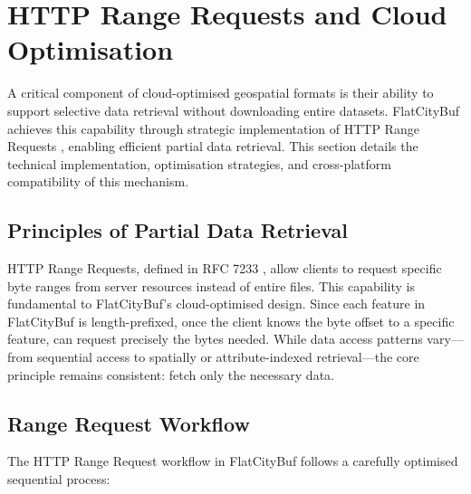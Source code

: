 
\section{HTTP Range Requests and Cloud Optimisation}
\label{methodology:http_range_requests}

A critical component of cloud-optimised geospatial formats is their ability to support selective data retrieval without downloading entire datasets. FlatCityBuf achieves this capability through strategic implementation of HTTP Range Requests \citep{http_range_requests}, enabling efficient partial data retrieval. This section details the technical implementation, optimisation strategies, and cross-platform compatibility of this mechanism.

\subsection{Principles of Partial Data Retrieval}
\label{methodology:http_range_requests:partial_retrieval_principles}

HTTP Range Requests, defined in RFC 7233 \citep{rfc_7233}, allow clients to request specific byte ranges from server resources instead of entire files. This capability is fundamental to FlatCityBuf's cloud-optimised design. Since each feature in FlatCityBuf is length-prefixed, once the client knows the byte offset to a specific feature, can request precisely the bytes needed. While data access patterns vary—from sequential access to spatially or attribute-indexed retrieval—the core principle remains consistent: fetch only the necessary data.

\subsection{Range Request Workflow}
\label{methodology:http_range_requests:range_request_workflow}

The HTTP Range Request workflow in FlatCityBuf follows a carefully optimised sequential process:

